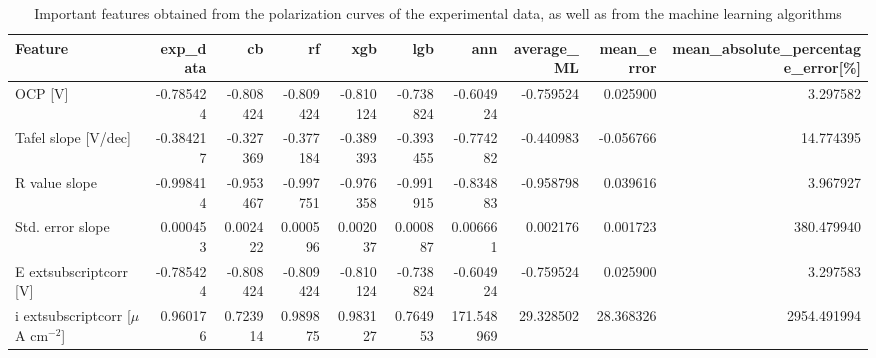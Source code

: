 \begin{table}[H]
\centering
\caption{Important features obtained from the polarization curves of the experimental data, as well as from the machine learning algorithms}
\label{imp_feat_ph_6.4}
\begin{tabular}{lrrrrrrrrr}
\toprule
Feature & exp_data & cb & rf & xgb & lgb & ann & average_ML & mean_error & mean_absolute_percentage_error[\%] \\
\midrule
OCP [V] & -0.785424 & -0.808424 & -0.809424 & -0.810124 & -0.738824 & -0.604924 & -0.759524 & 0.025900 & 3.297582 \\
Tafel slope [V/dec] & -0.384217 & -0.327369 & -0.377184 & -0.389393 & -0.393455 & -0.774282 & -0.440983 & -0.056766 & 14.774395 \\
R value slope & -0.998414 & -0.953467 & -0.997751 & -0.976358 & -0.991915 & -0.834883 & -0.958798 & 0.039616 & 3.967927 \\
Std. error slope & 0.000453 & 0.002422 & 0.000596 & 0.002037 & 0.000887 & 0.006661 & 0.002176 & 0.001723 & 380.479940 \\
E	extsubscript{corr} [V] & -0.785424 & -0.808424 & -0.809424 & -0.810124 & -0.738824 & -0.604924 & -0.759524 & 0.025900 & 3.297583 \\
i	extsubscript{corr} [$\mu$A cm$^{-2}$] & 0.960176 & 0.723914 & 0.989875 & 0.983127 & 0.764953 & 171.548969 & 29.328502 & 28.368326 & 2954.491994 \\
\bottomrule
\end{tabular}
\end{table}
